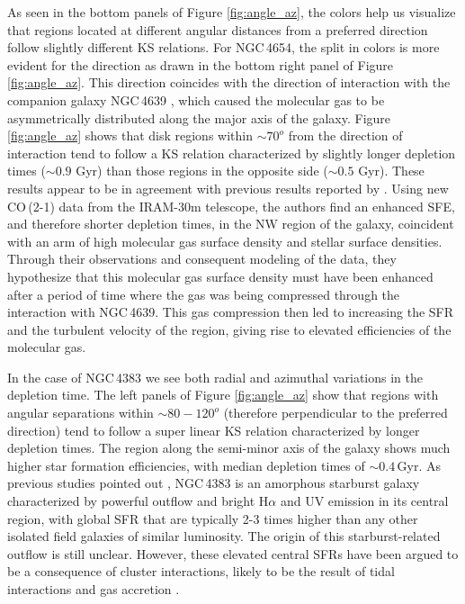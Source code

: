 \documentclass[longauth]{aa}
\begin{document}
As seen in the bottom panels of Figure \ref{fig:angle_az}, the colors help us visualize that regions located at different angular distances from a preferred direction follow slightly different KS relations. For NGC\,4654, the split in colors is more evident for the direction as drawn in the bottom right panel of Figure \ref{fig:angle_az}. This direction coincides with the direction of interaction with the companion galaxy NGC\,4639 \citep[see][Fig. 1]{Vollmer2003,Lizee2021}, which caused the molecular gas to be asymmetrically distributed along the major axis of the galaxy. Figure \ref{fig:angle_az} shows that disk regions within $\sim 70^o$ from the direction of interaction tend to follow a KS relation characterized by slightly longer depletion times ($\sim0.9$ Gyr) than those regions in the opposite side ($\sim0.5$ Gyr). These results appear to be in agreement with previous results reported by \citet{Lizee2021}. Using new CO\,(2-1) data from the IRAM-30m telescope, the authors find an enhanced SFE, and therefore shorter depletion times, in the NW region of the galaxy, coincident with an arm of high molecular gas surface density and stellar surface densities. Through their observations and consequent modeling of the data, they hypothesize that this molecular gas surface density must have been enhanced after a period of time where the gas was being compressed through the interaction with NGC\,4639. This gas compression then led to increasing the SFR and the turbulent velocity of the region, giving rise to elevated efficiencies of the molecular gas.

In the case of NGC\,4383 we see both radial and azimuthal variations in the depletion time. The left panels of Figure \ref{fig:angle_az} show that regions with angular separations within $\sim 80-120^o$ (therefore perpendicular to the preferred direction) tend to follow a super linear KS relation characterized by longer depletion times. The region along the semi-minor axis of the galaxy shows much higher star formation efficiencies, with median depletion times of $\sim 0.4$\,Gyr. As previous studies pointed out \citep[see e.g.,][]{Koopmann2004,Chung2009}, NGC\,4383 is an amorphous starburst galaxy characterized by powerful outflow and bright H$\alpha$ and UV emission in its central region, with global SFR that are typically 2-3 times higher than any other isolated field galaxies of similar luminosity. The origin of this starburst-related outflow is still unclear. However, these elevated central SFRs have been argued to be a consequence of cluster interactions, likely to be the result of tidal interactions and gas accretion \citep{Chung2009}.
\end{document}
